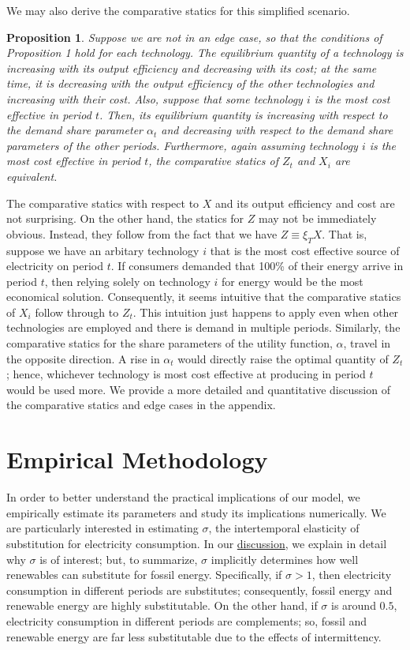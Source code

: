 \documentclass[11pt,a4paper]{extarticle}
\newtheorem{proposition}{Proposition}
\begin{document}
We may also derive the comparative statics for this simplified scenario.  
\begin{proposition}
	Suppose we are not in an edge case, so that the conditions of Proposition 1 hold for each technology. The equilibrium quantity of a technology is increasing with its output efficiency and decreasing with its cost; at the same time, it is decreasing with the output efficiency of the other technologies and increasing with their cost. Also, suppose that some technology $i$ is the most cost effective in period $t$. Then, its equilibrium quantity is increasing with respect to the demand share parameter $\alpha_t$ and decreasing with respect to the demand share parameters of the other periods. Furthermore, again assuming technology $i$ is the most cost effective in period $t$, the comparative statics of $Z_t$ and $X_i$ are equivalent. 
\end{proposition}	
The comparative statics with respect to $X$ and its output efficiency and cost are not surprising. On the other hand, the statics for $Z$ may not be immediately obvious. Instead, they follow from the fact that we have $Z \equiv \xi_T X$. That is, suppose we have an arbitary technology $i$ that is the most cost effective source of electricity on period $t$. If consumers demanded that 100\% of their energy arrive in period $t$, then relying solely on technology $i$ for energy would be the most economical solution. Consequently, it seems intuitive that the comparative statics of $X_i$ follow through to $Z_t$. This intuition just happens to apply even when other technologies are employed and there is demand in multiple periods. Similarly, the comparative statics for the share parameters of the utility function, $\alpha$, travel in the opposite direction. A rise in $\alpha_t$ would directly raise the optimal quantity of $Z_t$; hence, whichever technology is most cost effective at producing in period $t$ would be used more. We provide a more detailed and quantitative discussion of the comparative statics and edge cases in the appendix. 





\section{Empirical Methodology}
\label{sec:methodology}

In order to better understand the practical implications of our model, we empirically estimate its parameters and study its implications numerically. We are particularly interested in estimating $\sigma$, the intertemporal elasticity of substitution for electricity consumption. In our  \hyperref[sec:Discussion]{discussion}, we explain in detail why $\sigma$ is of interest; but, to summarize, $\sigma$ implicitly determines how well renewables can substitute for fossil energy. Specifically, if $\sigma > 1$, then electricity consumption in different periods are substitutes; consequently, fossil energy and renewable energy are highly substitutable. On the other hand, if $\sigma$ is around $0.5$, electricity consumption in different periods are complements; so, fossil and renewable energy are far less substitutable due to the effects of intermittency. 
\end{document}
